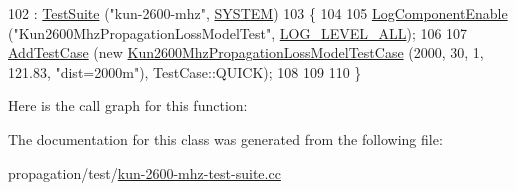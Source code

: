 \begin{DoxyCode}
102   : \hyperlink{classns3_1_1TestSuite_a904b0c40583b744d30908aeb94636d1a}{TestSuite} (\textcolor{stringliteral}{"kun-2600-mhz"}, \hyperlink{classns3_1_1TestSuite_a1ebfcab34ec8161e085e8e3a1855eae0a90c5529a26ab3a5ffcc6e57040dbd82e}{SYSTEM})
103 \{
104 
105   \hyperlink{namespacens3_adc4ef4f00bb2f5f4edae67fc3bc27f20}{LogComponentEnable} (\textcolor{stringliteral}{"Kun2600MhzPropagationLossModelTest"}, 
      \hyperlink{namespacens3_aa6464a4d69551a9cc968e17a65f39bdba022b1237a4fd1b08d034471df3c58586}{LOG\_LEVEL\_ALL});
106 
107   \hyperlink{classns3_1_1TestCase_a3718088e3eefd5d6454569d2e0ddd835}{AddTestCase} (\textcolor{keyword}{new} \hyperlink{classKun2600MhzPropagationLossModelTestCase}{Kun2600MhzPropagationLossModelTestCase} 
      (2000, 30, 1,  121.83, \textcolor{stringliteral}{"dist=2000m"}), TestCase::QUICK);
108 
109 
110 \}
\end{DoxyCode}


Here is the call graph for this function\+:




The documentation for this class was generated from the following file\+:\begin{DoxyCompactItemize}
\item 
propagation/test/\hyperlink{kun-2600-mhz-test-suite_8cc}{kun-\/2600-\/mhz-\/test-\/suite.\+cc}\end{DoxyCompactItemize}
